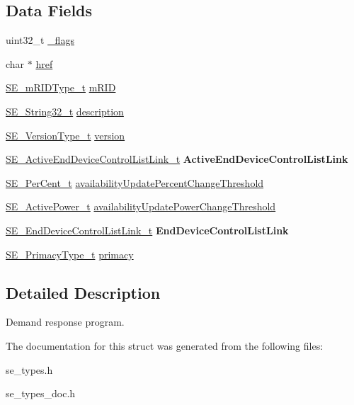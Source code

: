 \subsection*{Data Fields}
\begin{DoxyCompactItemize}
\item 
uint32\+\_\+t \hyperlink{group__DemandResponseProgram_gabee537c682dee0fedf7998b5d1d7c40a}{\+\_\+flags}
\item 
char $\ast$ \hyperlink{group__DemandResponseProgram_gabe6a9ae9d11c40abf1de49df60c33fb2}{href}
\item 
\hyperlink{group__mRIDType_gac74622112f3a388a2851b2289963ba5e}{S\+E\+\_\+m\+R\+I\+D\+Type\+\_\+t} \hyperlink{group__DemandResponseProgram_ga3a7dd308a30495cb98c203c6ae3074d1}{m\+R\+ID}
\item 
\hyperlink{group__String32_gac9f59b06b168b4d2e0d45ed41699af42}{S\+E\+\_\+\+String32\+\_\+t} \hyperlink{group__DemandResponseProgram_ga5ba27e88d6bbc2941240c7ed18ab91c7}{description}
\item 
\hyperlink{group__VersionType_ga4b8d27838226948397ed99f67d46e2ae}{S\+E\+\_\+\+Version\+Type\+\_\+t} \hyperlink{group__DemandResponseProgram_ga1e8b20fd85c49cfe1c51cf8e23f882b5}{version}
\item 
\hyperlink{structSE__ActiveEndDeviceControlListLink__t}{S\+E\+\_\+\+Active\+End\+Device\+Control\+List\+Link\+\_\+t} {\bfseries Active\+End\+Device\+Control\+List\+Link}
\item 
\hyperlink{group__PerCent_ga14278cbee754c63496035b722b417ddc}{S\+E\+\_\+\+Per\+Cent\+\_\+t} \hyperlink{group__DemandResponseProgram_ga6eb5a29af00dc76559cac834c13483e7}{availability\+Update\+Percent\+Change\+Threshold}
\item 
\hyperlink{structSE__ActivePower__t}{S\+E\+\_\+\+Active\+Power\+\_\+t} \hyperlink{group__DemandResponseProgram_gaa9a70f7f15f23119e07dc018038b5fd4}{availability\+Update\+Power\+Change\+Threshold}
\item 
\hyperlink{structSE__EndDeviceControlListLink__t}{S\+E\+\_\+\+End\+Device\+Control\+List\+Link\+\_\+t} {\bfseries End\+Device\+Control\+List\+Link}
\item 
\hyperlink{group__PrimacyType_ga484b22ef8ff92c8801e6a8b7bd8351eb}{S\+E\+\_\+\+Primacy\+Type\+\_\+t} \hyperlink{group__DemandResponseProgram_ga40432a268b74349a00a8d08ed9710519}{primacy}
\end{DoxyCompactItemize}


\subsection{Detailed Description}
Demand response program. 

The documentation for this struct was generated from the following files\+:\begin{DoxyCompactItemize}
\item 
se\+\_\+types.\+h\item 
se\+\_\+types\+\_\+doc.\+h\end{DoxyCompactItemize}
